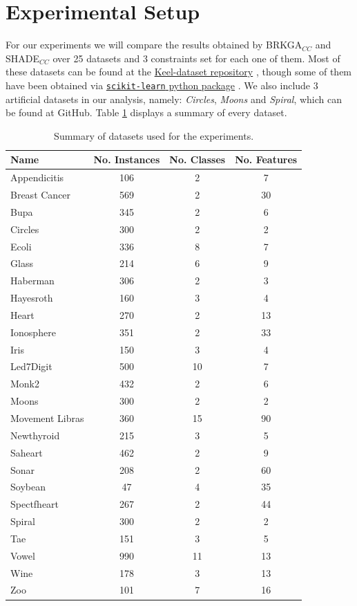 \documentclass[review]{elsarticle}
\begin{document}
\clearpage

\section{Experimental Setup} \label{sec:expSetup}

For our experiments we will compare the results obtained by BRKGA$_{CC}$ and SHADE$_{CC}$ over 25 datasets and 3 constraints set for each one of them. Most of these datasets can be found at the \href{https://sci2s.ugr.es/keel/category.php?cat=clas}{Keel-dataset repository} \cite{triguero2017keel}, though some of them have been obtained via
\href{https://scikit-learn.org/stable/datasets/index.html}{\texttt{scikit-learn} python package} \cite{scikit-learn}. We also include 3 artificial datasets in our analysis, namely: \textit{Circles}, \textit{Moons} and \textit{Spiral}, which can be found at GitHub. Table \ref{tab:datasets} displays a summary of every dataset.

\begin{table}[!h]
	\centering
	\small
	\begin{tabular}{l c c c}
		\hline
		Name & No. Instances & No. Classes & No. Features \\
		\hline
		Appendicitis & 106 & 2 & 7 \\
		Breast Cancer & 569 & 2 & 30 \\
		Bupa & 345 & 2 & 6 \\
		Circles & 300 & 2 & 2 \\
		Ecoli & 336 & 8 & 7 \\
		Glass & 214 & 6 & 9 \\
		Haberman & 306 & 2 & 3 \\
		Hayesroth & 160 & 3 & 4 \\
		Heart & 270 & 2 & 13 \\
		Ionosphere & 351 & 2 & 33 \\
		Iris & 150 & 3 & 4 \\
		Led7Digit & 500 & 10 & 7 \\
		Monk2 & 432 & 2 & 6 \\
		Moons & 300 & 2 & 2 \\
		Movement Libras & 360 & 15 & 90 \\
		Newthyroid & 215 & 3 & 5 \\
		Saheart & 462 & 2 & 9 \\
		Sonar & 208 & 2 & 60 \\
		Soybean & 47 & 4 & 35 \\
		Spectfheart & 267 & 2 & 44 \\
		Spiral & 300 & 2 & 2 \\
		Tae & 151 & 3 & 5 \\
		Vowel & 990 & 11 & 13 \\
		Wine & 178 & 3 & 13 \\
		Zoo & 101 & 7 & 16 \\
		\hline

	\end{tabular}%
	\caption{Summary of datasets used for the experiments.}
	\label{tab:datasets}
\end{table}
\end{document}
